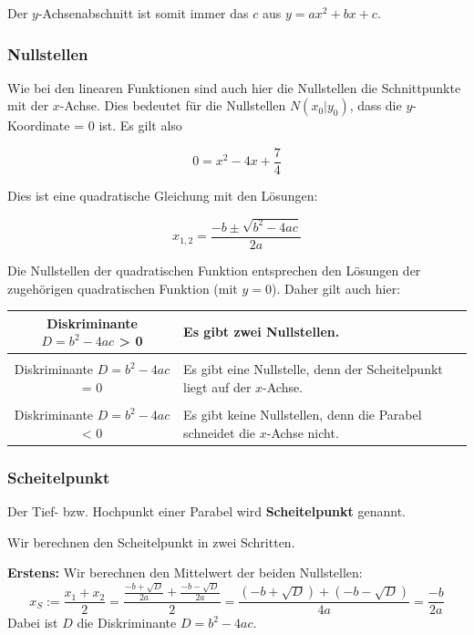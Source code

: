 Der $y$-Achsenabschnitt ist somit immer das $c$ aus $y = ax^2 + bx +
c$.

\subsubsection{Nullstellen}
Wie bei den linearen Funktionen sind auch hier die
Nullstellen die Schnittpunkte mit der $x$-Achse. Dies bedeutet für die
Nullstellen $N(x_0 | y_0)$, dass die $y$-Koordinate = 0 ist. Es gilt
also

$$0 = x^2 - 4 x + \frac{7}{4} $$

Dies ist eine quadratische Gleichung mit den Lösungen:

$$x_{1,2} = \frac{-b \pm \sqrt{b^2-4ac}}{2a}$$ 


\begin{bemerkung}{}{}
  Die Nullstellen der quadratischen Funktion entsprechen den Lösungen
  der zugehörigen quadratischen Funktion (mit $y=0$). Daher gilt
  auch hier: 


  \begin{tabular}{c|p{8cm}}
    Diskriminante $D=b^2-4ac$ > 0 & Es gibt zwei Nullstellen. \\
    \hline\\
    Diskriminante $D=b^2-4ac$ = 0 & Es gibt eine Nullstelle, denn der Scheitelpunkt liegt auf der $x$-Achse.\\
    \hline\\
    Diskriminante $D=b^2-4ac$ < 0 & Es gibt keine Nullstellen, denn die Parabel schneidet die $x$-Achse nicht.\\
  \end{tabular}
  
 \fi{} 
\end{bemerkung}
\newpage



\subsubsection{Scheitelpunkt}
Der Tief- bzw. Hochpunkt einer Parabel wird \textbf{Scheitelpunkt}
genannt.

Wir berechnen den Scheitelpunkt in zwei Schritten.

\textbf{Erstens:} Wir berechnen den Mittelwert der beiden Nullstellen:
$$x_S := \frac{x_{1} + x_{2}}{2} = \frac{\frac{-b+\sqrt{D}}{2a} + \frac{-b-\sqrt{D}}{2a}}{2} =
\frac{(-b+\sqrt{D}) + (-b-\sqrt{D})}{4a} =\frac{-b}{2a}$$
Dabei ist $D$ die Diskriminante $D=b^2-4ac$.

